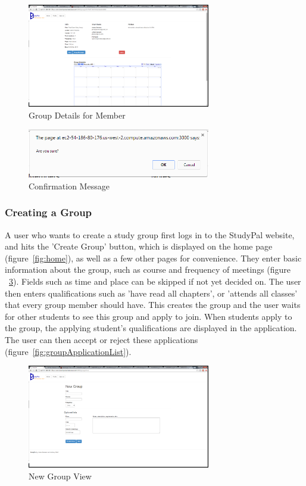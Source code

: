 \documentclass[conference]{IEEEtran}
\begin{document}
\begin{figure}[ht!]
\centering
\includegraphics[width=80mm]{figures/groupDetailsMember}
\caption{Group Details for Member \label{fig:groupDetailsMember}}
\end{figure}

\begin{figure}[ht!]
\centering
\includegraphics[width=80mm]{figures/confirmation}
\caption{Confirmation Message \label{fig:confirmation}}
\end{figure}

\subsubsection{Creating a Group}
A user who wants to create a study group first logs in to the StudyPal website, and hits the 'Create Group' button, which is displayed on the home page (figure~\ref{fig:home}), as well as a few other pages for convenience.
They enter basic information about the group, such as course and frequency of meetings (figure ~\ref{fig:newGroup}).
Fields such as time and place can be skipped if not yet decided on.
The user then enters qualifications such as 'have read all chapters', or 'attends all classes' that every group member should have.
This creates the group and the user waits for other students to see this group and apply to join. When students apply to the group, the applying student's qualifications are displayed in the application.
The user can then accept or reject these applications (figure~\ref{fig:groupApplicationList}).

\begin{figure}[ht!]
\centering
\includegraphics[width=80mm]{figures/newGroup}
\caption{New Group View \label{fig:newGroup}}
\end{figure}
\end{document}
